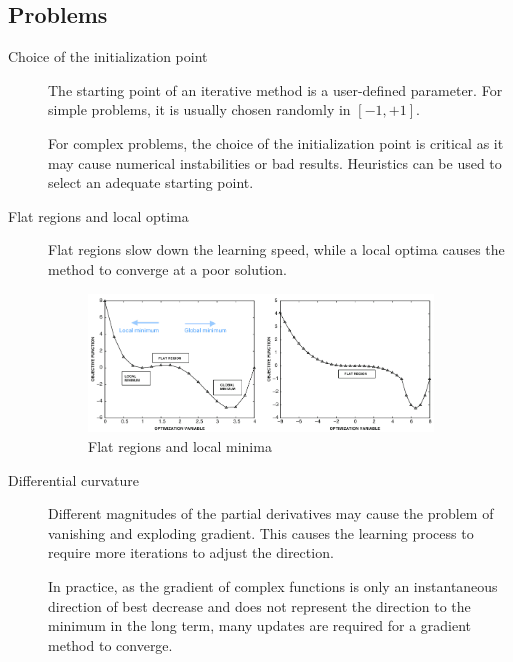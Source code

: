 \subsection{Problems}

\begin{description}
    \item[Choice of the initialization point] 
        The starting point of an iterative method is a user-defined parameter.
        For simple problems, it is usually chosen randomly in $[-1, +1]$.
        
        For complex problems, the choice of the initialization point is critical as 
        it may cause numerical instabilities or bad results.
        Heuristics can be used to select an adequate starting point.

    \item[Flat regions and local optima] 
        Flat regions slow down the learning speed,
        while a local optima causes the method to converge at a poor solution.
        \begin{figure}[ht]
            \centering
            \includegraphics[width=0.9\textwidth]{img/_descent_local_flat.pdf}
            \caption{Flat regions and local minima}
        \end{figure}
    
    \item[Differential curvature]
        Different magnitudes of the partial derivatives may cause the problem of
        vanishing and exploding gradient. 
        This causes the learning process to require more iterations to adjust the direction.

        In practice, as the gradient of complex functions is only an instantaneous direction of best decrease and
        does not represent the direction to the minimum in the long term, 
        many updates are required for a gradient method to converge.


\end{description}
